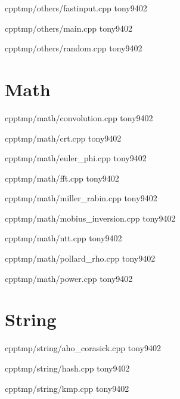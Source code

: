 {}
{}
{}
{cpp}{tmp/others/fastinput.cpp}
{tony9402}



{}
{}
{}
{cpp}{tmp/others/main.cpp}
{tony9402}



{}
{}
{}
{cpp}{tmp/others/random.cpp}
{tony9402}


\section{Math}


{}
{}
{}
{cpp}{tmp/math/convolution.cpp}
{tony9402}



{}
{}
{}
{cpp}{tmp/math/crt.cpp}
{tony9402}



{}
{}
{}
{cpp}{tmp/math/euler_phi.cpp}
{tony9402}



{}
{}
{}
{cpp}{tmp/math/fft.cpp}
{tony9402}



{}
{}
{}
{cpp}{tmp/math/miller_rabin.cpp}
{tony9402}



{}
{}
{}
{cpp}{tmp/math/mobius_inversion.cpp}
{tony9402}



{}
{}
{}
{cpp}{tmp/math/ntt.cpp}
{tony9402}



{}
{}
{}
{cpp}{tmp/math/pollard_rho.cpp}
{tony9402}



{}
{}
{}
{cpp}{tmp/math/power.cpp}
{tony9402}


\section{String}


{}
{}
{}
{cpp}{tmp/string/aho_corasick.cpp}
{tony9402}



{}
{}
{}
{cpp}{tmp/string/hash.cpp}
{tony9402}



{}
{}
{}
{cpp}{tmp/string/kmp.cpp}
{tony9402}



